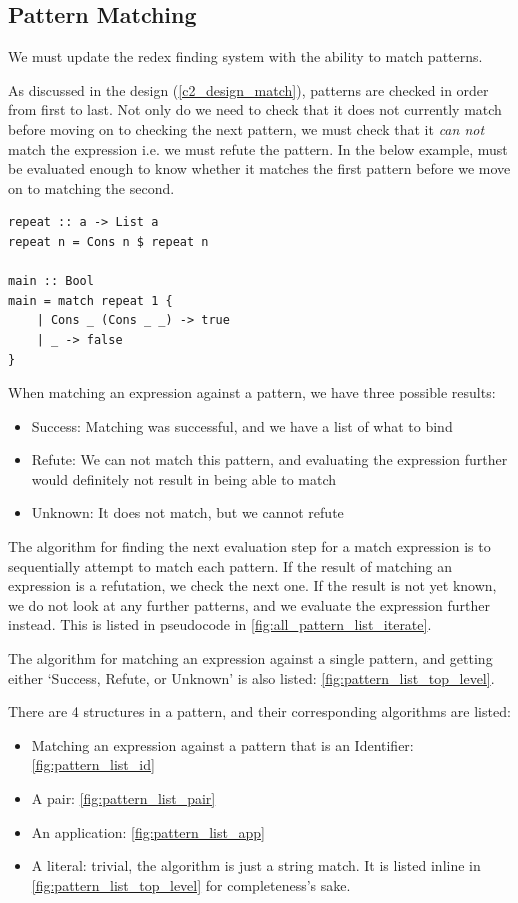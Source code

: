 \pagebreak %

\subsection{Pattern Matching}
We must update the redex finding system with the ability to match patterns. 

As discussed in the design (\ref{c2_design_match}), patterns are checked in order from first to last. Not only do we need to check that it does not currently match before moving on to checking the next pattern, we must check that it \textit{can not} match the expression i.e. we must refute the pattern. In the below example,  must be evaluated enough to know whether it matches the first pattern before we move on to matching the second. 

\begin{lstlisting}[language=SFL]
repeat :: a -> List a
repeat n = Cons n $ repeat n

main :: Bool
main = match repeat 1 {
    | Cons _ (Cons _ _) -> true
    | _ -> false
}
\end{lstlisting}

When matching an expression against a pattern, we have three possible results:

\begin{itemize}
    \item Success: Matching was successful, and we have a list of what to bind
    \item Refute: We can not match this pattern, and evaluating the expression further would definitely not result in being able to match
    \item Unknown: It does not match, but we cannot refute
\end{itemize}

The algorithm for finding the next evaluation step for a match expression is to sequentially attempt to match each pattern. If the result of matching an expression is a refutation, we check the next one. If the result is not yet known, we do not look at any further patterns, and we evaluate the expression further instead. This is listed in pseudocode in \ref{fig:all_pattern_list_iterate}. 

The algorithm for matching an expression against a single pattern, and getting either `Success, Refute, or Unknown' is also listed: \ref{fig:pattern_list_top_level}. 

There are 4 structures in a pattern, and their corresponding algorithms are listed: 
\begin{itemize}
    \item Matching an expression against a pattern that is an Identifier: \ref{fig:pattern_list_id}
    \item A pair: \ref{fig:pattern_list_pair}
    \item An application: \ref{fig:pattern_list_app}
    \item A literal: trivial, the algorithm is just a string match. It is listed inline in \ref{fig:pattern_list_top_level} for completeness's sake. 
\end{itemize}

